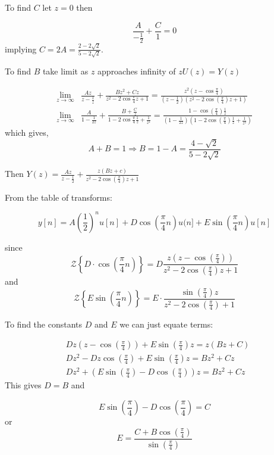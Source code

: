 \documentclass{article}
\begin{document}
To find $C$ let $z=0$ then

\[
	\frac{A}{-\frac{1}{2}} + \frac{C}{1} = 0
\]
implying $C = 2A = \frac{2-2\sqrt{2}}{5-2\sqrt{2}}$.

To find $B$ take limit as $z$ approaches infinity of $z U(z) = Y(z)$

\begin{align*}
\lim _{z \rightarrow \infty} & \frac{A z}{z-\frac{1}{z}}+\frac{B z^{2}+C z}{z^{2}-2 \cos \frac{\pi}{4} z+1}=\frac{z^{2}\left(z-\cos \frac{\pi}{4}\right)}{\left(z-\frac{1}{2}\right)\left(z^2 -2\cos\left(\frac{\pi}{4}\right)z + 1\right)}                     \\
\lim _{z \rightarrow \infty}	 & \frac{A}{1-\frac{1}{2z}}+\frac{B+\frac{C}{z}}{1-2 \cos \frac{\pi}{4}\frac{1}{z}+\frac{1}{z^2}}=\frac{1-\cos \left(\frac{\pi}{4}\right)\frac{1}{z}}{\left(1-\frac{1}{2z}\right)\left(1 -2\cos\left(\frac{\pi}{4}\right)\frac{1}{z} + \frac{1}{z^2}\right)}
\end{align*}
which gives,
\[
A+B=1 \Rightarrow B=1-A = \frac{4-\sqrt{2}}{5-2\sqrt{2}}
\]

Then $Y(z)=\frac{A z}{z-\frac{1}{2}}+\frac{z(B z+c)}{z^{2}-2 \cos \left(\frac{\pi}{4}\right) z+1}$

From the table of transforms:

\[
	y[n]=A\left(\frac{1}{2}\right)^{n} u[n]+D \cos \left(\frac{\pi}{4} n\right) u(n]+E \sin \left(\frac{\pi}{4} n\right) u[n]
\]

since
\[
	\mathcal{Z}\left\{D \cdot \cos \left(\frac{\pi}{4} n\right)\right\}=D \frac{z\left(z-\cos \left(\frac{\pi}{4}\right)\right)}{z^{2}-2 \cos \left(\frac{\pi}{4}\right) z+1}
\]
and
\[
	\mathcal{Z}\left\{E \sin \left(\frac{\pi}{4} n\right)\right\}=E \cdot \frac{\sin \left(\frac{\pi}{4}\right) z}{z^{2}-2 \cos \left(\frac{\pi}{4}\right)+1}
\]

To find the constants $D$ and $E$ we can just equate terms:

\begin{align*}
	 & D z\left(z-\cos \left(\frac{\pi}{4}\right)\right)+E \sin \left(\frac{\pi}{4}\right) z=z(B z+C)         \\
	 & D z^{2}-D z \cos \left(\frac{\pi}{4}\right)+E \sin \left(\frac{\pi}{4}\right) z=B z^{2}+C z            \\
  & D z^{2}+\left(E \sin \left(\frac{\pi}{4}\right)-D \cos \left(\frac{\pi}{4}\right)\right) z=B z^{2}+C z
\end{align*}
This gives $D=B$ and

\[
E \sin \left(\frac{\pi}{4}\right)-D \cos \left(\frac{\pi}{4}\right)=C
\]
or
\[
E = \frac{C+B \cos \left(\frac{\pi}{4}\right)}{\sin \left(\frac{\pi}{4}\right)}
\]
\end{document}
